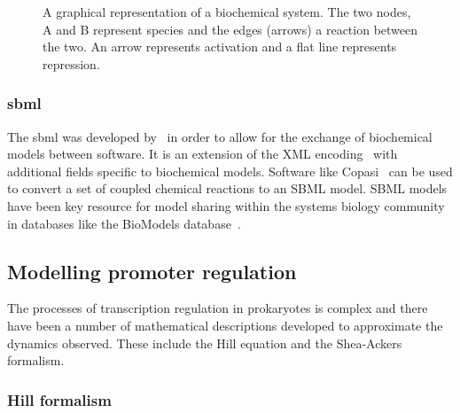 \begin{figure}[h!]
\begin{center}
\caption[A graphical representation of a biochemical system]{A graphical representation of a biochemical system. The two nodes, A and B represent species and the edges (arrows) a reaction between the two. An arrow represents activation and a flat line represents repression.}
\label{fig:Toggle_switch_example}
\end{center}

\end{figure}	



\subsubsection{\acrfull{sbml}}

The \acrfull{sbml} was developed by~\textcite{Hucka:2004wh} in order to allow for the exchange of biochemical models between software. It is an extension of the XML encoding~\autocite{DuCharme:1999} with additional fields specific to biochemical models. Software like Copasi~\autocite{Hoops:2006gy} can be used to convert a set of coupled chemical reactions to an SBML model. SBML models have been key resource for model sharing within the systems biology community~\autocite{Wilkinson:2006td} in databases like the BioModels database~\autocite{LeNovere:2006ep}. 

\subsection{Modelling promoter regulation}

The processes of transcription regulation in prokaryotes is complex and there have been a number of mathematical descriptions developed to approximate the dynamics observed. These include the Hill equation and the Shea-Ackers formalism. 

\subsubsection{Hill formalism}


